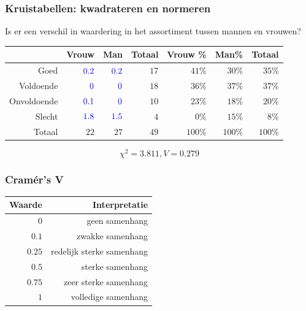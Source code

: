\documentclass{beamer}
\begin{document}
    \begin{frame}
      \frametitle{Kruistabellen: kwadrateren en normeren}
      Is er een verschil in waardering in het assortiment tussen mannen en vrouwen?
      \begin{table}[h] \centering
        \begin{tabular}{@{}rrrrrrr@{}} \toprule
                      & Vrouw                   & Man                     & Totaal & Vrouw \% & Man\%   & Totaal  \\
          \midrule
          Goed        & $\textcolor{blue}{0.2}$ & $\textcolor{blue}{0.2}$ & $17$   & $41$\%   & $30$\%  & $35$\% \\
          Voldoende   & $\textcolor{blue}{0}$   & $\textcolor{blue}{0}$   & $18$   & $36$\%   & $37$\%  & $37$\% \\
          Onvoldoende & $\textcolor{blue}{0.1}$ & $\textcolor{blue}{0}$   & $10$   & $23$\%   & $18$\%  & $20$\% \\
          Slecht      & $\textcolor{blue}{1.8}$ & $\textcolor{blue}{1.5}$ & $4$    & $0$\%    & $15$\%  & $8$\%  \\
          Totaal      & $22$                    & $27$                    & $49$   & $100$\%  & $100$\% & $100$\%   \\
          \bottomrule
        \end{tabular}
      \end{table}
      \[ \chi^{2} = 3.811, V= 0.279 \]
    \end{frame}

    \begin{frame}
      \frametitle{Cramér's V}
      \begin{table}[h] \centering
        \begin{tabular}{@{}rr@{}} \toprule
          Waarde & Interpretatie \\
          \midrule
          $0$ & geen samenhang \\
          $0.1$ &  zwakke samenhang \\
          $0.25$ & redelijk sterke samenhang \\
          $0.5$ & sterke samenhang \\
          $0.75$ & zeer sterke samenhang \\
          $1$ & volledige samenhang \\
          \bottomrule
        \end{tabular}
      \end{table}
    \end{frame}
\end{document}
